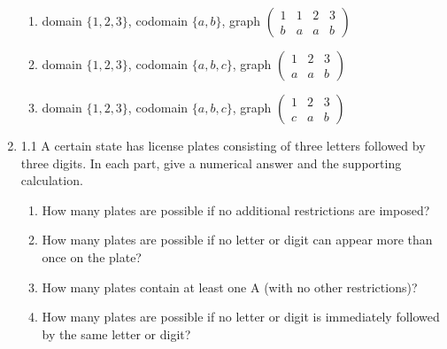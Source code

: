 \documentclass[12pt]{article}
\begin{document}
\begin{enumerate}
\begin{enumerate}

\item  domain $\{1,2,3\}$, codomain $\{a,b\}$, graph $\left(\begin{array}{cccc}1 & 1 & 2 & 3 \\ b & a & a & b\end{array}\right)$

\vspace{1 in}

\item   domain $\{1,2,3\}$, codomain $\{a,b,c\}$, graph $\left(\begin{array}{cccc}1 & 2 & 3 \\ a & a & b\end{array}\right)$

\vspace{1 in}

\item  domain $\{1,2,3\}$, codomain $\{a,b,c\}$, graph $\left(\begin{array}{cccc}1 & 2 & 3 \\ c & a & b\end{array}\right)$

\end{enumerate}

\newpage

\item 1.1  A certain state has license plates consisting of three letters followed by three digits.  In each part, give a numerical answer and the supporting calculation.

\begin{enumerate}

\item  How many plates are possible if no additional restrictions are imposed?

\item  How many plates are possible if no letter or digit can appear more than once on the plate?

\item  How many plates contain at least one A (with no other restrictions)?

\item  How many plates are possible if no letter or digit is immediately followed by the same letter or digit?

\end{enumerate}

\newpage


\end{enumerate}
\end{document}
